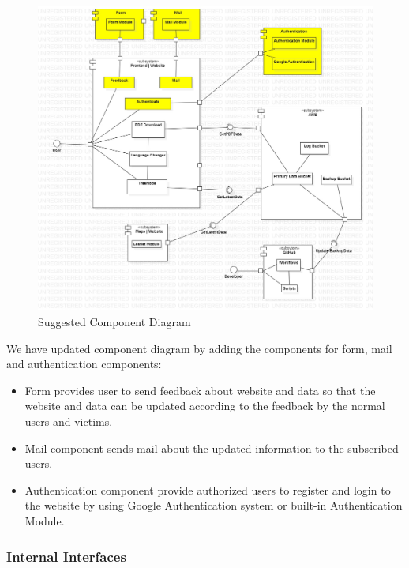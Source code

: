 \begin{figure}[H]
  \centering
  \includegraphics[width=\linewidth]{img/component-diagram-s5.jpg}
  \caption{Suggested Component Diagram}
\end{figure}

We have updated component diagram by adding the components for form, mail and authentication components:
\begin{itemize}
  \item Form provides user to send feedback about website and data so that the website and data can be updated according to the feedback by the normal users and victims.
  \item Mail component sends mail about the updated information to the subscribed users.
  \item Authentication component provide authorized users to register and login to the website by using Google Authentication system or built-in Authentication Module.
\end{itemize}

\subsubsection{Internal Interfaces}

